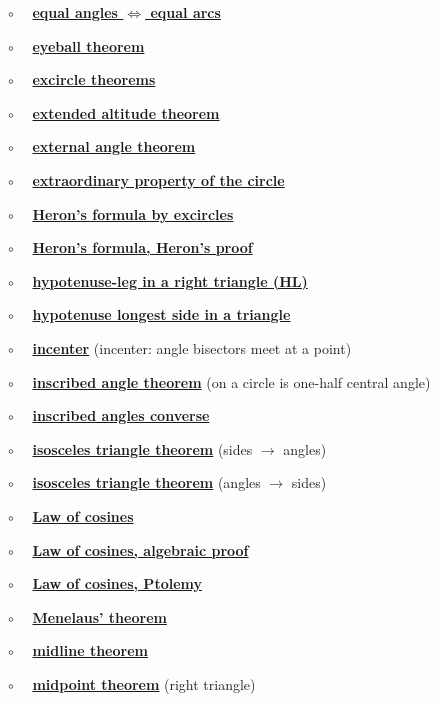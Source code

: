 \documentclass[11pt, oneside]{article}
\begin{document}
$\circ$ \ \ \hyperref[sec:angles_on_same_arc]{\textbf{equal angles $\iff$ equal arcs}}

$\circ$ \ \ \hyperref[sec:eyeball_theorem]{\textbf{eyeball theorem}}

$\circ$ \ \ \hyperref[sec:excircle_theorems]{\textbf{excircle theorems}}

$\circ$ \ \ \hyperref[sec:extended_altitude]{\textbf{extended altitude theorem}}

$\circ$ \ \ \hyperref[sec:external_angle_theorem]{\textbf{external angle theorem}}

$\circ$ \ \ \hyperref[sec:extraordinary_property]{\textbf{extraordinary property of the circle}}

$\circ$ \ \ \hyperref[sec:Heron_formula_excircles]{\textbf{Heron's formula by excircles}}

$\circ$ \ \ \hyperref[sec:Heron_formula_Heron]{\textbf{Heron's formula, Heron's proof}}

$\circ$ \ \ \hyperref[sec:SSA_in_right]{\textbf{hypotenuse-leg in a right triangle (HL)}}

$\circ$ \ \ \hyperref[sec:hypotenuse_longest]{\textbf{hypotenuse longest side in a triangle}}

$\circ$ \ \ \hyperref[sec:incenter]{\textbf{incenter}} (incenter:  angle bisectors meet at a point)

$\circ$ \ \ \hyperref[sec:inscribed_angle_theorem]{\textbf{inscribed angle theorem}} (on a circle is one-half central angle)

$\circ$ \ \ \hyperref[sec:inscribed_angles_converse]{\textbf{inscribed angles converse}}

$\circ$ \ \  \hyperref[sec:isosceles_triangle_theorem]{\textbf{isosceles triangle theorem}} (sides $\rightarrow$ angles)

$\circ$ \ \  \hyperref[sec:isosceles_converse]{\textbf{isosceles triangle theorem}} (angles $\rightarrow$ sides)

$\circ$ \ \ \hyperref[sec:law_of_cosines]{\textbf{Law of cosines}}

$\circ$ \ \ \hyperref[sec:law_of_cosines_algebraic]{\textbf{Law of cosines, algebraic proof}}

$\circ$ \ \ \hyperref[sec:LOC_by_Ptolemy]{\textbf{Law of cosines, Ptolemy}}

$\circ$ \ \ \hyperref[sec:Menelaus_theorem]{\textbf{Menelaus' theorem}}

$\circ$ \ \ \hyperref[sec:midline_theorem]{\textbf{midline theorem}} 

$\circ$ \ \ \hyperref[sec:right_triangle_midpoint_theorem]{\textbf{midpoint theorem}} (right triangle)
\end{document}

